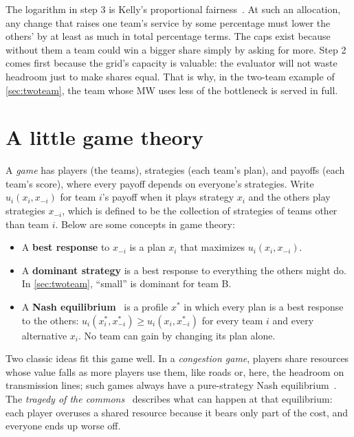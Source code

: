 \documentclass[10pt]{article}
\begin{document}
The logarithm in step 3 is Kelly's proportional fairness~\cite{kelly1998rate}.
At such an allocation, any change that raises one team's service by some
percentage must lower the others' by at least as much in total percentage
terms. The caps exist because without them a team could win a bigger share
simply by asking for more. Step 2 comes first because the grid's capacity is
valuable: the evaluator will not waste headroom just to make shares equal.
That is why, in the two-team example of \cref{sec:twoteam}, the team whose MW
uses less of the bottleneck is served in full.

\section{A little game theory}\label{app:game}

A \emph{game} has players (the teams), strategies (each team's plan), and
payoffs (each team's score), where every payoff depends on everyone's
strategies. Write $u_i(x_i, x_{-i})$ for team $i$'s payoff when it plays strategy $x_i$
and the others play strategies $x_{-i}$, which is defined to be the collection of strategies of teams other than team $i$. Below are some concepts in game theory:

\begin{itemize}[leftmargin=*]
  \item A \textbf{best response} to $x_{-i}$ is a plan $x_i$ that maximizes
    $u_i(x_i, x_{-i})$.
  \item A \textbf{dominant strategy} is a best response to everything the
    others might do. In \cref{sec:twoteam}, ``small'' is dominant for team B.
  \item A \textbf{Nash equilibrium}~\cite{nash1950equilibrium} is a profile
    $x^*$ in which every plan is a best response to the others:
    $u_i(x_i^*, x_{-i}^*) \ge u_i(x_i, x_{-i}^*)$ for every team $i$ and every
    alternative $x_i$. No team can gain by changing its plan alone.
\end{itemize}

Two classic ideas fit this game well. In a \emph{congestion game}, players
share resources whose value falls as more players use them, like roads or, here,
the headroom on transmission lines; such games always have a pure-strategy Nash
equilibrium~\cite{rosenthal1973class}. The \emph{tragedy of the
commons}~\cite{hardin1968tragedy} describes what can happen at that
equilibrium: each player overuses a shared resource because it bears only part
of the cost, and everyone ends up worse off.
\end{document}
